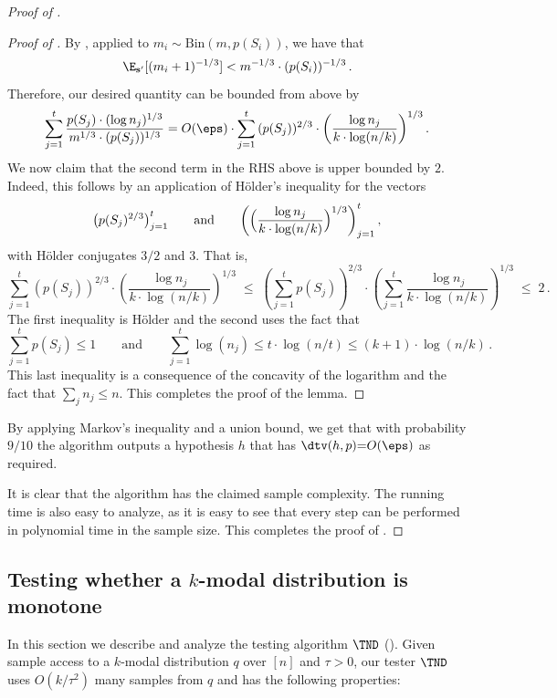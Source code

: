 \begin{proof}[Proof of ]
\begin{proof}[Proof of ]
By , applied to $m_i  \sim \mathrm{Bin}(m,p(S_i))$, we have that
\[
\E_{\mathbf{s}'} [ (m_i+1)^{-1/3}] < m^{-1/3} \cdot (p(S_i))^{-1/3}\,.
\]
Therefore, our desired quantity can be bounded from above by
$$\sum_{j=1}^{t} \frac {p(S_j) \cdot  (\log n_j)^{1/3}} {m^{1/3} \cdot (p(S_j)) ^{1/3}} =
O(\eps) \cdot \sum_{j=1}^{t}{(p(S_j))^{2/3} \cdot \left(\frac{\log n_j}{k \cdot \log(n/k)}\right)^{1/3}} \,.$$
We now claim that the second term in the RHS above is upper bounded by $2$.
Indeed, this follows by an application of H\"older's inequality
for the vectors
\[
\bigl(p(S_j)^{2/3}\bigr)_{j=1}^{t}\qquad\text{and}\qquad
\biggl(\Bigl(\frac{\log n_j} { k \cdot \log(n/k)}\Bigr)^{1/3}\biggr)_{j=1}^{t}\,,
\]
with  H\"older conjugates $3/2$ and $3$. That is,
%
\[
\sum_{j=1}^{t} \left(p(S_j)\right)^{2/3} \cdot \left(\frac{\log n_j}{ k \cdot \log(n/k)}\right)^{1/3} \;\leq\; \left( \sum_{j=1}^{t} p(S_j) \right)^{2/3} \cdot 
\left( \sum_{j=1}^{t} \frac{\log n_j}{ k \cdot \log(n/k)} \right)^{1/3} \;\leq\; 2\,.
\]
%
The first inequality is  H\"older and the second uses the fact
that  \[
\sum_{j=1}^{t} p(S_j) \leq 1\qquad\text{and}\qquad
\sum_{j=1}^t \log (n_j) \leq t \cdot \log(n/t) \leq (k+1) \cdot
\log(n/k)\,.
\]
This last inequality is a consequence of the concavity of the logarithm and the fact that $\sum_j n_j \leq n$. This completes the proof of the lemma.
\end{proof}

By applying Markov's inequality and a union bound, we get that with
probability $9/10$ the algorithm \hyperref[alg:learn-kmodal]{}
outputs a hypothesis $h$ that has $\dtv(h,p) {=} O(\eps)$ as required.



It is clear that the algorithm has the claimed sample complexity.
The running time is also easy to analyze, as it is easy to see that
every step can be performed in polynomial time %
in the sample size. This completes the proof of .
\end{proof}


%

\subsection{Testing whether a \texorpdfstring{$k$-modal}{k-modal} distribution is monotone}
\label{ssec:test}


In this section we describe and analyze the testing  algorithm $\TND$ ().
Given sample access to a $k$-modal distribution $q$ over $[n]$ and $\tau>0$,
our tester $\TND$ uses {$O(k/\tau^2)$} many samples from $q$ and has the
following properties:
%

